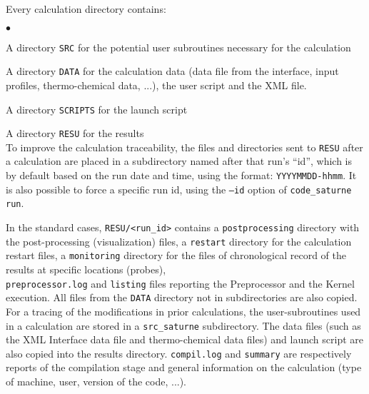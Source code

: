 \noindent
Every calculation directory contains:
\begin{list}{$\bullet$}{}
\item A directory \texttt{SRC} for the potential user subroutines
      necessary for the calculation
\item A directory \texttt{DATA} for the calculation data (data
      file from the interface, input profiles, thermo-chemical data, ...), the user script and the XML file.
\item A directory \texttt{SCRIPTS} for the launch script
\item A directory \texttt{RESU} for the results\\
To improve the calculation traceability, the files and directories
sent to \texttt{RESU} after a calculation are  placed in a subdirectory
named after that run's ``id'', which is by default based on the run date
and time, using the format: \texttt{YYYYMMDD-hhmm}.
It is also possible to force a specific run id, using the \texttt{--id}
option of \texttt{code\_saturne run}.
\end{list}

\noindent
In the standard cases, \texttt{RESU/<run\_id>} contains a
\texttt{postprocessing} directory with the post-processing
(visualization) files, a \texttt{restart} directory for the calculation
restart files, a \texttt{monitoring} directory for the files of chronological
record of the results at specific locations (probes),\\
\texttt{preprocessor.log} and \texttt{listing} files reporting the
Preprocessor and the Kernel execution. All files from the \texttt{DATA}
directory not in subdirectories are also copied. For a tracing of
the modifications in prior calculations, the user-subroutines used in
a calculation are stored in a \texttt{src\_saturne} subdirectory. The data files
(such as the XML Interface data file and thermo-chemical data files) and
launch script are also copied into the results directory. \texttt{compil.log} and
\texttt{summary} are respectively reports of the compilation stage and
general information on the calculation (type of machine, user,
version of the code, ...).

